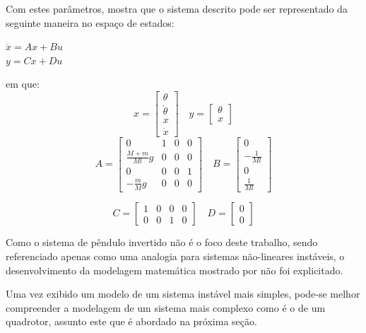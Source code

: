 Com estes parâmetros,  mostra que o sistema descrito pode ser representado da seguinte maneira  no espaço de estados:
\begin{center}\label{eq:k1}
$\dot{x}=Ax+Bu$ \\
$y=Cx+Du$
\end{center}
em que:
%
\[
	x =
		\begin{bmatrix}
		\theta \\ \dot{\theta} \\ x \\ \dot{x}
		\end{bmatrix}\quad
	y = 
	\begin{bmatrix}
			\theta \\
			x
	\end{bmatrix}
\]
\[
	A = 
	\begin{bmatrix}
		0 & 1 & 0 & 0 \\
		\frac{M+m}{Ml}g & 0 & 0 & 0 \\
		0 & 0 & 0 & 1 \\
		-\frac{m}{M}g & 0 & 0 & 0
	\end{bmatrix}\quad
	B = 
	\begin{bmatrix}
		0 \\
		-\frac{1}{Ml} \\
		0 \\
		\frac{1}{Ml}
	\end{bmatrix}
\]

\[
	C = 
		\begin{bmatrix}
			1 & 0 & 0 & 0 \\
			0 & 0 & 1 & 0
		\end{bmatrix}\quad
	D = 
		\begin{bmatrix}
			0 \\
			0
		\end{bmatrix}
\]

Como o sistema de pêndulo invertido não é o foco deste trabalho, sendo referenciado apenas como uma analogia para sistemas não-lineares instáveis, o desenvolvimento da modelagem matemática mostrado por  não foi explicitado.

Uma vez exibido um modelo de um sistema instável mais simples, pode-se melhor compreender a modelagem de um sistema mais complexo como é o de um quadrotor, assunto este que é abordado na próxima seção.
